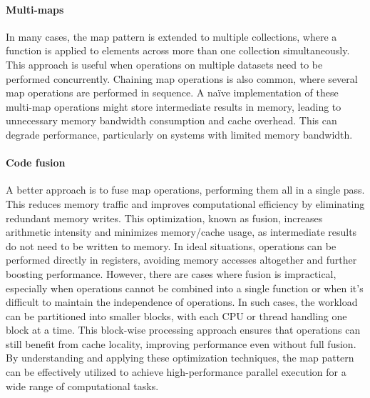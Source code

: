 \paragraph*{Multi-maps}
In many cases, the map pattern is extended to multiple collections, where a function is applied to elements across more than one collection simultaneously. 
This approach is useful when operations on multiple datasets need to be performed concurrently.
Chaining map operations is also common, where several map operations are performed in sequence.
A naïve implementation of these multi-map operations might store intermediate results in memory, leading to unnecessary memory bandwidth consumption and cache overhead. 
This can degrade performance, particularly on systems with limited memory bandwidth.

\paragraph*{Code fusion}
A better approach is to fuse map operations, performing them all in a single pass.
This reduces memory traffic and improves computational efficiency by eliminating redundant memory writes.
This optimization, known as fusion, increases arithmetic intensity and minimizes memory/cache usage, as intermediate results do not need to be written to memory.
In ideal situations, operations can be performed directly in registers, avoiding memory accesses altogether and further boosting performance.
However, there are cases where fusion is impractical, especially when operations cannot be combined into a single function or when it's difficult to maintain the independence of operations. 
In such cases, the workload can be partitioned into smaller blocks, with each CPU or thread handling one block at a time. 
This block-wise processing approach ensures that operations can still benefit from cache locality, improving performance even without full fusion.
By understanding and applying these optimization techniques, the map pattern can be effectively utilized to achieve high-performance parallel execution for a wide range of computational tasks.

